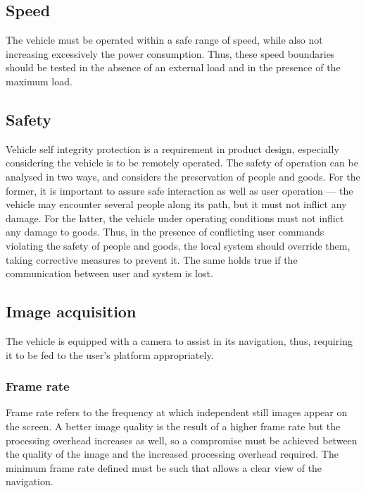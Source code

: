 \subsection{Speed}%
\label{sec:speed-tests}
The vehicle must be operated within a safe range of speed, while also not increasing excessively the power consumption. Thus, these speed boundaries should be tested in the absence of an external load and in the presence of the maximum load.
\subsection{Safety}%
\label{sec:org83942c3}
Vehicle self integrity protection is a requirement in product design, especially considering the vehicle is to
be remotely operated. The safety of operation can be analysed in two ways, and considers the
preservation of people and goods. For the former, it is important to assure safe interaction as well as user operation --- the vehicle may encounter
several people along its path, but it must not inflict any damage. For the
latter, the vehicle under operating conditions must not inflict any damage to
goods. Thus, in the presence of conflicting user commands violating the safety
of people and goods, the local system should override them, taking corrective
measures to prevent it. The same holds true if the communication between user
and system is lost.
\subsection{Image acquisition}%
\label{sec:image-acquisit}
The vehicle is equipped with a camera to assist in its navigation,
thus, requiring it to be fed to the user's platform appropriately.
\subsubsection{Frame rate}%
\label{sec:org5adf4ee}
Frame rate refers to the frequency at which independent still images appear on the screen. A better image quality is the result of a higher frame rate but the processing overhead increases as well, so a compromise must be achieved between the quality of the image and the increased processing overhead required. The minimum frame rate defined must be such that allows a clear view of the navigation.
